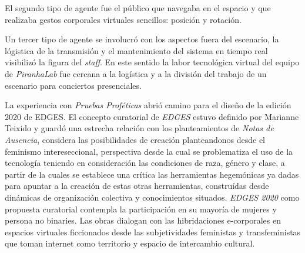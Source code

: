 El segundo tipo de agente fue el público que navegaba en el espacio y que realizaba gestos corporales virtuales sencillos: posición y rotación. 

Un tercer tipo de agente se involucró con los aspectos fuera del escenario, la lógistica de la transmisión y el mantenimiento del sistema en tiempo real visibilizó la figura del \textit{staff}. En este sentido la labor tecnológica virtual del equipo de \textit{PiranhaLab} fue cercana a la logística y a la división del trabajo de un escenario para conciertos presenciales. 

La experiencia con \textit{Pruebas Proféticas} abrió camino para el diseño de la edición 2020 de EDGES. El concepto curatorial de \textit{EDGES} estuvo definido por Marianne Teixido y guardó una estrecha relación con los planteamientos de \textit{Notas de Ausencia}, considera las posibilidades de creación planteandonos desde el feminismo intereseccional, perspectiva desde la cual se problematiza el uso de la tecnología teniendo en consideración las condiciones de raza, género y clase, a partir de la cuales se establece una crítica las herramientas hegemónicas ya dadas para apuntar a la creación de estas otras herramientas, construídas desde dinámicas de organización colectiva y conocimientos situados. \textit{EDGES 2020} como propuesta curatorial contempla la participación en su mayoría de mujeres y persona no binaries. Las obras dialogan con las hibridaciones e-corporales en espacios virtuales ficcionados desde las subjetividades feministas y transfeministas que toman internet como territorio y espacio de intercambio cultural.

